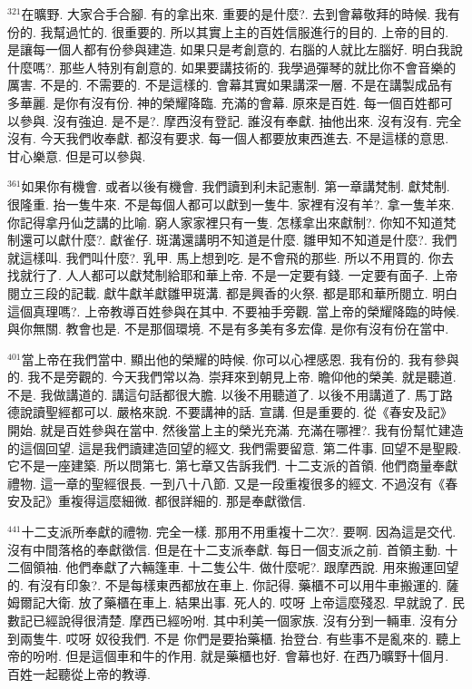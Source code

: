 \documentclass{book}
\begin{document}
$^{321}$在曠野.
大家合手合腳.
有的拿出來.
重要的是什麼?.
去到會幕敬拜的時候.
我有份的.
我幫過忙的.
很重要的.
所以其實上主的百姓信服進行的目的.
上帝的目的.
是讓每一個人都有份參與建造.
如果只是考創意的.
右腦的人就比左腦好.
明白我說什麼嗎?.
那些人特別有創意的.
如果要講技術的.
我學過彈琴的就比你不會音樂的厲害.
不是的.
不需要的.
不是這樣的.
會幕其實如果講深一層.
不是在講製成品有多華麗.
是你有沒有份.
神的榮耀降臨.
充滿的會幕.
原來是百姓.
每一個百姓都可以參與.
沒有強迫.
是不是?.
摩西沒有登記.
誰沒有奉獻.
抽他出來.
沒有沒有.
完全沒有.
今天我們收奉獻.
都沒有要求.
每一個人都要放東西進去.
不是這樣的意思.
甘心樂意.
但是可以參與.

$^{361}$如果你有機會.
或者以後有機會.
我們讀到利未記憲制.
第一章講梵制.
獻梵制.
很隆重.
抬一隻牛來.
不是每個人都可以獻到一隻牛.
家裡有沒有羊?.
拿一隻羊來.
你記得拿丹仙芝講的比喻.
窮人家家裡只有一隻.
怎樣拿出來獻制?.
你知不知道梵制還可以獻什麼?.
獻雀仔.
斑溝還講明不知道是什麼.
雛甲知不知道是什麼?.
我們就這樣叫.
我們叫什麼?.
乳甲.
馬上想到吃.
是不會飛的那些.
所以不用買的.
你去找就行了.
人人都可以獻梵制給耶和華上帝.
不是一定要有錢.
一定要有面子.
上帝閱立三段的記載.
獻牛獻羊獻雛甲斑溝.
都是興香的火祭.
都是耶和華所閱立.
明白這個真理嗎?.
上帝教導百姓參與在其中.
不要袖手旁觀.
當上帝的榮耀降臨的時候.
與你無關.
教會也是.
不是那個環境.
不是有多美有多宏偉.
是你有沒有份在當中.

$^{401}$當上帝在我們當中.
顯出他的榮耀的時候.
你可以心裡感恩.
我有份的.
我有參與的.
我不是旁觀的.
今天我們常以為.
崇拜來到朝見上帝.
瞻仰他的榮美.
就是聽道.
不是.
我做講道的.
講這句話都很大膽.
以後不用聽道了.
以後不用講道了.
馬丁路德說讀聖經都可以.
嚴格來說.
不要講神的話.
宣講.
但是重要的.
從《春安及記》開始.
就是百姓參與在當中.
然後當上主的榮光充滿.
充滿在哪裡?.
我有份幫忙建造的這個回望.
這是我們讀建造回望的經文.
我們需要留意.
第二件事.
回望不是聖殿.
它不是一座建築.
所以問第七.
第七章又告訴我們.
十二支派的首領.
他們商量奉獻禮物.
這一章的聖經很長.
一到八十八節.
又是一段重複很多的經文.
不過沒有《春安及記》重複得這麼細微.
都很詳細的.
那是奉獻徵信.

$^{441}$十二支派所奉獻的禮物.
完全一樣.
那用不用重複十二次?.
要啊.
因為這是交代.
沒有中間落格的奉獻徵信.
但是在十二支派奉獻.
每日一個支派之前.
首領主動.
十二個領袖.
他們奉獻了六輛篷車.
十二隻公牛.
做什麼呢?.
跟摩西說.
用來搬運回望的.
有沒有印象?.
不是每樣東西都放在車上.
你記得.
藥櫃不可以用牛車搬運的.
薩姆爾記大衛.
放了藥櫃在車上.
結果出事.
死人的.
哎呀 上帝這麼殘忍.
早就說了.
民數記已經說得很清楚.
摩西已經吩咐.
其中利美一個家族.
沒有分到一輛車.
沒有分到兩隻牛.
哎呀 奴役我們.
不是 你們是要抬藥櫃.
抬登台.
有些事不是亂來的.
聽上帝的吩咐.
但是這個車和牛的作用.
就是藥櫃也好.
會幕也好.
在西乃曠野十個月.
百姓一起聽從上帝的教導.
\end{document}
